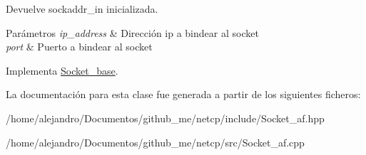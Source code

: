 Devuelve sockaddr\+\_\+in inicializada. 


\begin{DoxyParams}{Parámetros}
{\em ip\+\_\+address} & Dirección ip a bindear al socket \\
\hline
{\em port} & Puerto a bindear al socket \\
\hline
\end{DoxyParams}


Implementa \hyperlink{classSocket__base_a887249ae6a25693230c0febf403a2545}{Socket\+\_\+base}.



La documentación para esta clase fue generada a partir de los siguientes ficheros\+:\begin{DoxyCompactItemize}
\item 
/home/alejandro/\+Documentos/github\+\_\+me/netcp/include/Socket\+\_\+af.\+hpp\item 
/home/alejandro/\+Documentos/github\+\_\+me/netcp/src/Socket\+\_\+af.\+cpp\end{DoxyCompactItemize}
